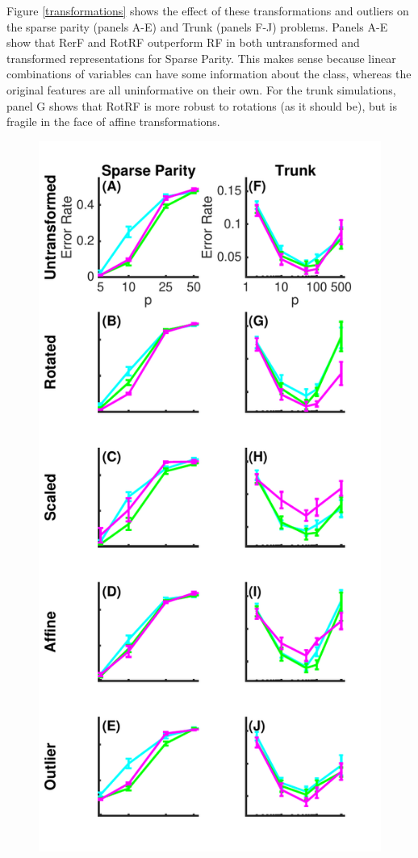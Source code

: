\documentclass{article}
\begin{document}
Figure \ref{transformations} shows the effect of these transformations and outliers on the sparse parity (panels A-E) and Trunk (panels F-J) problems. Panels A-E show that RerF and RotRF outperform RF in both untransformed and transformed representations for Sparse Parity. This makes sense because linear combinations of variables can have some information about the class, whereas the original features are all uninformative on their own. For the trunk simulations, panel G shows that RotRF is more robust to rotations (as it should be), but is fragile in the face of affine transformations.

\begin{figure}[ht]
\vskip 0.2in
\begin{center}
\centerline{\includegraphics[scale=0.5]{../Figures/pdf/Fig3_transformations3}}

\end{center}
\end{figure}
\end{document}
